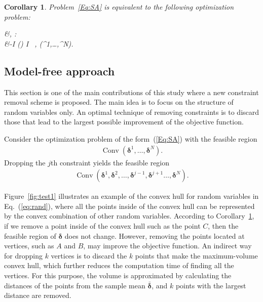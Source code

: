 \documentclass[journal]{IEEEtran}
\newtheorem{cor}{Corollary}
\def \st {\operatorname{s.t.}\quad }
\begin{document}
\begin{cor}\label{thm-1}
	Problem~\eqref{Eq:SA} is equivalent to the following optimization problem:
	\begin{flalign}\label{Eq:SA-Conv}
		&\min \alpha, \quad \st : \nonumber\\
		&-I \preceq \Pi(\boldsymbol{\delta}) \preceq \alpha I ~, \; \forall \boldsymbol{\delta}\in {}(\boldsymbol{\delta}^1,\ldots,\boldsymbol{\delta}^N).
	\end{flalign}
\end{cor}
\subsection{Model-free approach}
This section is one of the main contributions of this study where a new constraint removal scheme is proposed. The main idea is to focus on the structure of random variables only.
An optimal technique of removing constraints is to discard those that lead to the largest possible improvement of the objective function.

Consider the optimization problem of the form~(\ref{Eq:SA}) with the feasible region
\begin{eqnarray}\label{eq:rand}
	\operatorname{Conv}(\boldsymbol{\delta}^1,\ldots,\boldsymbol{\delta}^N).
\end{eqnarray}
Dropping the $j$th constraint yields the feasible region
\begin{eqnarray}\label{key}
	\operatorname{Conv} (\boldsymbol\delta^1,\boldsymbol\delta^2,\ldots,\boldsymbol\delta^{j-1}, \boldsymbol\delta^{j+1}\ldots,\boldsymbol\delta^N).
\end{eqnarray}

Figure~\ref{fig:test1} illustrates an example of the convex hull for random variables in Eq.~(\ref{eq:rand}), where all the points inside of the convex hull can be represented by the convex combination of other random variables. According to Corollary~\ref{thm-1}, if we remove a point inside of the convex hull such as the point $C$, then the feasible region of $ \boldsymbol{\delta} $ does not change. However, removing the points located at vertices, such as $A$ and $B$, may improve the objective function. An indirect way for dropping $k$ vertices is to discard the $k$ points that make the maximum-volume convex hull, which further reduces the computation time of finding all the vertices. For this purpose, the volume is approximated by calculating the distances of the points from the sample mean $\bar{\boldsymbol\delta}$, and $ k $ points with the largest distance are removed.
\end{document}
